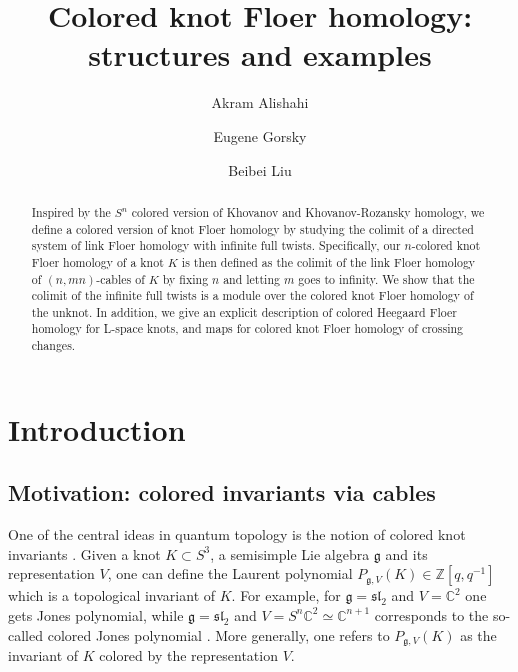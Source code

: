 \documentclass{amsart}
\title{Colored knot Floer homology: structures and examples}
\author{Akram Alishahi}
\author{Eugene Gorsky}
\author{Beibei Liu}
\newcommand{\C}{\mathbb{C}}
\newcommand{\Z}{\mathbb{Z}}
\begin{document}
\begin{abstract}
Inspired by the $S^n$ colored version of Khovanov and Khovanov-Rozansky homology, we define a colored version of knot Floer homology by studying the colimit of a directed system of link Floer homology with infinite full twists. Specifically,  our $n$-colored knot Floer homology of a knot $K$ is then defined as the colimit of the link Floer homology of $(n, mn)$-cables of  $K$ by fixing $n$ and letting $m$ goes to infinity. We show that the colimit of the infinite full twists is a module over the colored knot Floer homology of the unknot.  In addition,  we give an explicit description of colored  Heegaard Floer homology for L-space knots, and maps for colored knot Floer homology of crossing changes. 
\end{abstract}

\maketitle



\section{Introduction}



\subsection{Motivation: colored invariants via cables}

One of the central ideas in quantum topology is the  notion of colored knot invariants \cite{RT}. Given a knot $K\subset S^3$, a semisimple Lie algebra $\mathfrak{g}$ and its representation $V$, one can define the Laurent polynomial $P_{\mathfrak{g},V}(K)\in \Z[q,q^{-1}]$ which is a topological invariant of $K$. For example, for $\mathfrak{g}=\mathfrak{sl}_2$ and $V=\C^2$ one gets Jones polynomial, while  $\mathfrak{g}=\mathfrak{sl}_2$ and $V=S^n\C^2\simeq \C^{n+1}$ corresponds to the so-called colored Jones polynomial \cite{MM}. More generally, one refers to $P_{\mathfrak{g},V}(K)$ as the invariant of $K$ colored by the representation $V$. 
\end{document}
